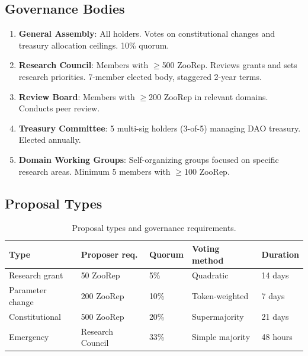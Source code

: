 \subsection{Governance Bodies}

\begin{enumerate}
  \item \textbf{General Assembly}: All \ZOO{} holders. Votes on
    constitutional changes and treasury allocation ceilings. 10\% quorum.

  \item \textbf{Research Council}: Members with $\geq$500 ZooRep.
    Reviews grants and sets research priorities. 7-member elected body,
    staggered 2-year terms.

  \item \textbf{Review Board}: Members with $\geq$200 ZooRep in
    relevant domains. Conducts peer review.

  \item \textbf{Treasury Committee}: 5 multi-sig holders (3-of-5)
    managing DAO treasury. Elected annually.

  \item \textbf{Domain Working Groups}: Self-organizing groups focused
    on specific research areas. Minimum 5 members with $\geq$100 ZooRep.
\end{enumerate}

\subsection{Proposal Types}

\begin{table}[H]
\centering
\caption{Proposal types and governance requirements.}
\label{tab:proposals}
\begin{tabular}{p{3cm}p{2.5cm}p{2cm}p{2.5cm}p{2cm}}
\toprule
\textbf{Type} & \textbf{Proposer req.} & \textbf{Quorum} &
  \textbf{Voting method} & \textbf{Duration} \\
\midrule
Research grant & 50 ZooRep & 5\% & Quadratic & 14 days \\
Parameter change & 200 ZooRep & 10\% & Token-weighted & 7 days \\
Constitutional & 500 ZooRep & 20\% & Supermajority & 21 days \\
Emergency & Research Council & 33\% & Simple majority & 48 hours \\
\bottomrule
\end{tabular}
\end{table}


